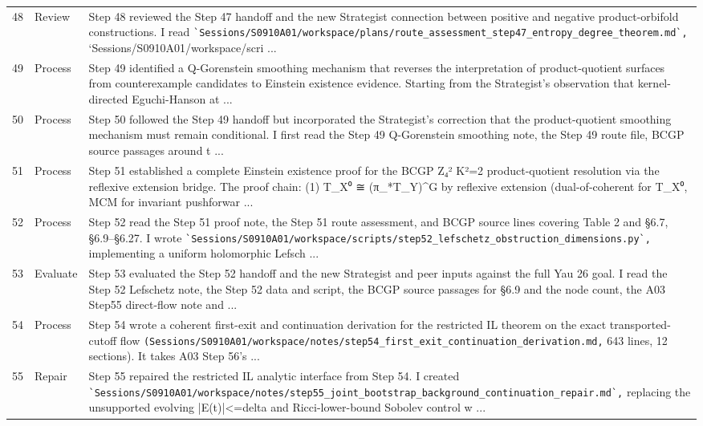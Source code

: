 \documentclass[UTF8,fontset=fandol,zihao=-4]{ctexart}
\begin{document}
\begin{longtable}{r p{} >{\raggedright\arraybackslash}p{}}
48 & Review & Step 48 reviewed the Step 47 handoff and the new Strategist connection between positive and negative product-orbifold constructions. I read \nolinkurl{`Sessions/S0910A01/workspace/plans/route_assessment_step47_entropy_degree_theorem.md`,} `Sessions/S0910A01/workspace/scri ...\\
49 & Process & Step 49 identified a Q-Gorenstein smoothing mechanism that reverses the interpretation of product-quotient surfaces from counterexample candidates to Einstein existence evidence. Starting from the Strategist's observation that kernel-directed Eguchi-Hanson at  ...\\
50 & Process & Step 50 followed the Step 49 handoff but incorporated the Strategist's correction that the product-quotient smoothing mechanism must remain conditional. I first read the Step 49 Q-Gorenstein smoothing note, the Step 49 route file, BCGP source passages around t ...\\
51 & Process & Step 51 established a complete Einstein existence proof for the BCGP Z₄² K²=2 product-quotient resolution via the reflexive extension bridge. The proof chain: (1) T\_X⁰ ≅ (π\_*T\_Y)\textasciicircum{}G by reflexive extension (dual-of-coherent for T\_X⁰, MCM for invariant pushforwar ...\\
52 & Process & Step 52 read the Step 51 proof note, the Step 51 route assessment, and BCGP source lines covering Table 2 and §6.7, §6.9--§6.27. I wrote \nolinkurl{`Sessions/S0910A01/workspace/scripts/step52_lefschetz_obstruction_dimensions.py`,} implementing a uniform holomorphic Lefsch ...\\
53 & Evaluate & Step 53 evaluated the Step 52 handoff and the new Strategist and peer inputs against the full Yau 26 goal. I read the Step 52 Lefschetz note, the Step 52 data and script, the BCGP source passages for §6.9 and the node count, the A03 Step55 direct-flow note and ...\\
54 & Process & Step 54 wrote a coherent first-exit and continuation derivation for the restricted IL theorem on the exact transported-cutoff flow \nolinkurl{(Sessions/S0910A01/workspace/notes/step54_first_exit_continuation_derivation.md,} 643 lines, 12 sections). It takes A03 Step 56's  ...\\
55 & Repair & Step 55 repaired the restricted IL analytic interface from Step 54. I created \nolinkurl{`Sessions/S0910A01/workspace/notes/step55_joint_bootstrap_background_continuation_repair.md`,} replacing the unsupported evolving |E(t)|<=delta and Ricci-lower-bound Sobolev control w ...\\

\end{longtable}
\end{document}

